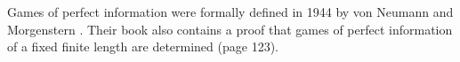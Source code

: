\documentclass{book}%
\begin{document}
Games of perfect information were formally defined
in 1944 by von Neumann and Morgenstern . Their book also contains a proof that
games of perfect information of a fixed finite length are determined
(page 123).


\end{document}

